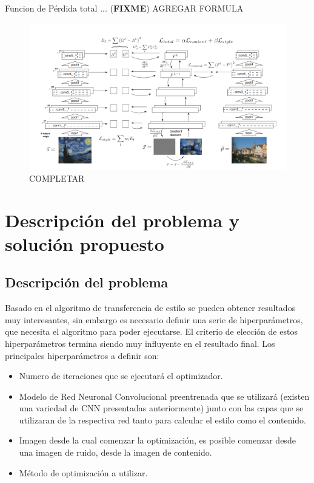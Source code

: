 \documentclass[a4paper,11pt,spanish]{book}
\newcommand*{\FIXME}[1]{{(\textbf{FIXME}) {#1}}}
\begin{document}
      Funcion de Pérdida total ...
      \FIXME{AGREGAR FORMULA}\\
      \begin{figure}[h]
	\includegraphics[scale=0.8]{./img/gatys_2.png}
	\caption{COMPLETAR}
	\label{fig:gatys_2}
      \end{figure}
    
     
\chapter{Descripción del problema y solución propuesto}
  \section{Descripción del problema}
    Basado en el algoritmo de transferencia de estilo se pueden obtener resultados muy interesantes, sin embargo es necesario definir una serie de hiperparámetros,
    que necesita el algoritmo para poder ejecutarse. El criterio de elección de estos hiperparámetros termina siendo muy influyente en el resultado final. 
    Los principales hiperparámetros a definir son:
    \begin{itemize}
      \item Numero de iteraciones que se ejecutará el optimizador.
      \item Modelo de Red Neuronal Convolucional preentrenada que se utilizará (existen una variedad de CNN presentadas anteriormente) junto con las capas que se utilizaran de la 
      respectiva red tanto para calcular el estilo como el contenido.
      \item Imagen desde la cual comenzar la optimización, es posible comenzar desde una imagen de ruido, desde la imagen de contenido.
      \item Método de optimización a utilizar.
    \end{itemize}
\end{document}
